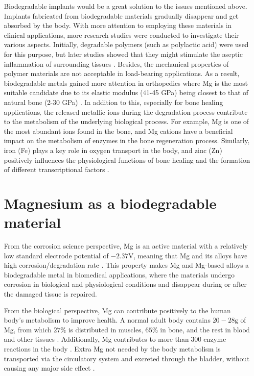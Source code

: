Biodegradable implants would be a great solution to the issues mentioned above. Implants fabricated from biodegradable materials gradually disappear and get absorbed by the body. With more attention to employing these materials in clinical applications, more research studies were conducted to investigate their various aspects. Initially, degradable polymers (such as polylactic acid) were used for this purpose, but later studies showed that they might stimulate the aseptic inflammation of surrounding tissues \cite{Gao2022}. Besides, the mechanical properties of polymer materials are not acceptable in load-bearing applications. As a result, biodegradable metals gained more attention in orthopedics where Mg is the most suitable candidate due to its elastic modulus (41-45 GPa) being closest to that of natural bone (2-30 GPa) \cite{Wang2020a}. In addition to this, especially for bone healing applications, the released metallic ions during the degradation process contribute to the metabolism of the underlying biological process. For example, Mg is one of the most abundant ions found in the bone, and Mg cations have a beneficial impact on the metabolism of enzymes in the bone regeneration process. Similarly, iron (Fe) plays a key role in oxygen transport in the body, and zinc (Zn) positively influences the physiological functions of bone healing and the formation of different transcriptional factors \cite{Wegener2020,Gasior2021,Han2020,Levy2017,Liu2015}.


\section{Magnesium as a biodegradable material}

From the corrosion science perspective, Mg is an active material with a relatively low standard electrode potential of $-2.37\text{V}$, meaning that Mg and its alloys have high corrosion/degradation rate \cite{Gao2022}. This property makes Mg and Mg-based alloys a biodegradable metal in biomedical applications, where the materials undergo corrosion in biological and physiological conditions and disappear during or after the damaged tissue is repaired.

From the biological perspective, Mg can contribute positively to the human body's metabolism to improve health. A normal adult body contains $20-28\text{g}$ of Mg, from which $27\%$ is distributed in muscles, $65\%$ in bone, and the rest in blood and other tissues \cite{Vormann2003}. Additionally, Mg contributes to more than 300 enzyme reactions in the body \cite{Elin1988}. Extra Mg not needed by the body metabolism is transported via the circulatory system and excreted through the bladder, without causing any major side effect \cite{Wang2020a}.


